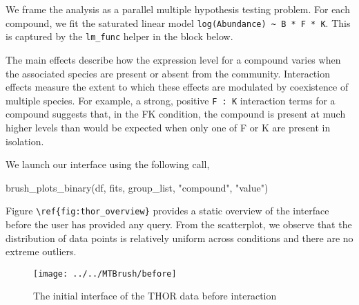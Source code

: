\color{black}

We frame the analysis as a parallel multiple hypothesis testing problem.
For each compound, we fit the saturated linear model
\texttt{log(Abundance)\ \textasciitilde{}\ B\ *\ F\ *\ K}. This is
captured by the \texttt{lm\_func} helper in the block below.

\begin{Schunk}
\end{Schunk}

The main effects describe how the expression level for a compound varies
when the associated species are present or absent from the community.
Interaction effects measure the extent to which these effects are
modulated by coexistence of multiple species. For example, a strong,
positive \texttt{F\ :\ K} interaction terms for a compound suggests
that, in the FK condition, the compound is present at much higher levels
than would be expected when only one of F or K are present in isolation.

We launch our interface using the following call,

\begin{Schunk}
\begin{Sinput}
brush_plots_binary(df, fits, group_list, "compound", "value")
\end{Sinput}
\end{Schunk}

Figure \texttt{\textbackslash{}ref\{fig:thor\_overview\}} provides a
static overview of the interface before the user has provided any query.
From the scatterplot, we observe that the distribution of data points is
relatively uniform across conditions and there are no extreme outliers.

\begin{Schunk}
\begin{figure}
\texttt{[image: ../../MTBrush/before]} \caption[The initial interface of the THOR data before interaction]{The initial interface of the THOR data before interaction}\label{fig:unnamed-chunk-12}
\end{figure}
\end{Schunk}

